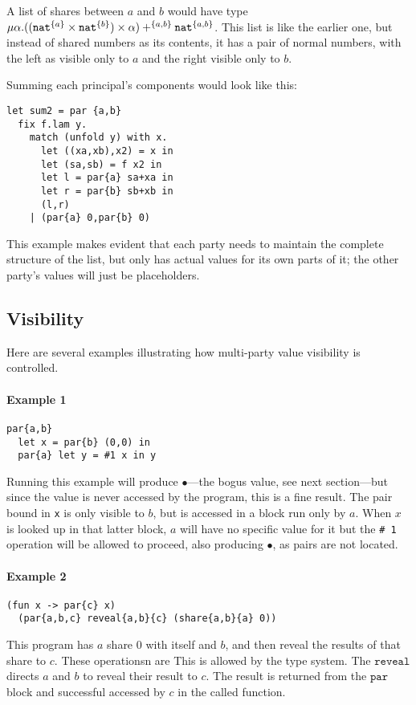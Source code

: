 \documentclass[10pt]{article}
\newcommand{\kw}[1]{\ensuremath{\mathtt{#1}}}
\newcommand{\tnat}{\ensuremath{\mathtt{nat}}}
\newcommand{\tpair}[2]{\ensuremath{{#1} \times {#2}}}
\newcommand{\tsum}[3]{\ensuremath{{#1} +^{#3} {#2}}}
\newcommand{\trec}[2]{\ensuremath{\mu {#1}.{#2}}}
\newcommand{\vcrash}{\ensuremath{\bullet}}
\begin{document}
A list of shares between $a$ and $b$ would have type
$\trec{\alpha}{\tsum{(\tpair{(\tpair{\tnat^{\{a\}}}{\tnat^{\{b\}}})}{\alpha})}{\tnat^{\twoprins}}{\twoprins}}$.
This list is like the earlier one, but instead of shared numbers as
its contents, it has a pair of normal numbers, with the left as
visible only to $a$ and the right visible only to $b$.

Summing each principal's components would look like this:
\begin{verbatim}
let sum2 = par {a,b}
  fix f.lam y.
    match (unfold y) with x.
      let ((xa,xb),x2) = x in
      let (sa,sb) = f x2 in
      let l = par{a} sa+xa in
      let r = par{b} sb+xb in
      (l,r)
    | (par{a} 0,par{b} 0)
\end{verbatim}
This example makes evident that each party needs to maintain the
complete structure of the list, but only has actual values for its own
parts of it; the other party's values will just be placeholders.

\subsection{Visibility}

Here are several examples illustrating how multi-party value
visibility is controlled.

\paragraph{Example 1}
\begin{verbatim}
par{a,b}
  let x = par{b} (0,0) in
  par{a} let y = #1 x in y
\end{verbatim}
Running this example will produce $\vcrash$---the bogus value, see
next section---but since the value is never accessed by the program,
this is a fine result. The pair bound in \texttt{x} is only visible to
$b$, but is accessed in a block run only by $a$. When $x$ is looked up
in that latter block, $a$ will have no specific value for it but the
\texttt{\# 1} operation will be allowed to proceed, also producing
$\vcrash$, as pairs are not located.

\paragraph{Example 2}
\begin{verbatim}
(fun x -> par{c} x) 
  (par{a,b,c} reveal{a,b}{c} (share{a,b}{a} 0))
\end{verbatim}
This program has $a$ share $0$ with itself and $b$, and then reveal
the results of that share to $c$. These operationsn are 
This is allowed by the type system. The $\kw{reveal}$ directs $a$ and
$b$ to reveal their result to $c$. The result is returned from the
$\kw{par}$ block and successful accessed by $c$ in the called function.
\end{document}
